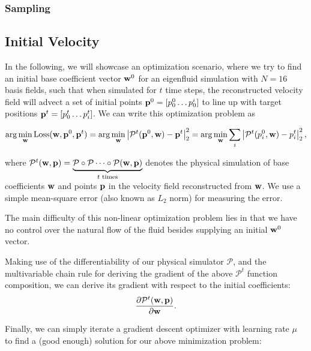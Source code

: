 \subsubsection*{Sampling}
\subsection{Initial Velocity}

In the following, we will showcase an optimization scenario, where we try to
find an initial base coefficient vector $\vb{w}^{0}$ for an eigenfluid
simulation with $N=16$ basis fields, such that when simulated for $t$ time
steps, the reconstructed velocity field will advect a set of initial points
$\vb{p}^0 = [p^0_0\dots p^i_0]$ to line up with target positions 
$\vb{p}^{t} = [p^t_0\dots p^t_i]$. We can write this optimization problem as 

$$\arg\min_{\vb{w}} \text{Loss}(\vb{w}, \vb{p}^0, \vb{p}^t)
= \arg\min_{\vb{w}} \left| \mathcal{P}^{t}(\vb{p}^0, \vb{w})
- \vb{p}^t\right|_2^2 = \arg\min_{\vb{w}}
\sum_{i}\left|\mathcal{P}^{t}(p^0_i, \vb{w}) - p^t_i\right|_2^2, $$

where $\mathcal{P}^t(\vb{w}, \vb{p}) = \underbrace{\mathcal{P} \circ
\mathcal{P} \dots \circ \mathcal{P}(\vb{w}, \vb{p})}_{t \text{ times}}$
denotes the physical simulation of base coefficients $\vb{w}$ and 
points $\vb{p}$ in the velocity field reconstructed from $\vb{w}$. We
use a simple mean-square error (also known as $L_2$ norm) for measuring the error.

The main difficulty of this non-linear optimization problem lies in that we have
no control over the natural flow of the fluid besides supplying an initial
$\vb{w}^0$ vector.

Making use of the differentiability of our physical simulator $\mathcal{P}$, and
the multivariable chain rule for deriving the gradient of the above
$\mathcal{P}^t$ function composition, we can derive its gradient with respect to
the initial coefficients:
$$\frac{\partial \mathcal{P}^t(\vb{w},\vb{p})}{\partial \vb{w}}.$$


Finally, we can simply iterate a gradient descent optimizer with learning
rate $\mu$ to find a (good enough) solution for our above minimization problem:


